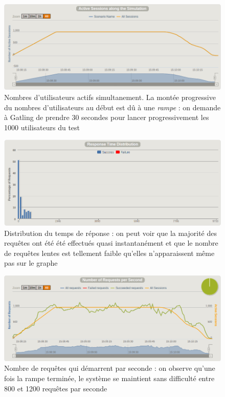 \begin{figure}[h!]
	\centering
		\includegraphics[scale=0.5]{active-sessions.png}
	\caption{Nombres d'utilisateurs actifs simultanement. La montée progressive du nombres d'utilisateurs au début est dû à une \textit{rampe} : on demande à Gatling de prendre 30 secondes pour lancer progressivement les 1000 utilisateurs du test}
\end{figure}

\begin{figure}[h!]
	\centering
		\includegraphics[scale=0.5]{response-time.png}
	\caption{Distribution du temps de réponse : on peut voir que la majorité des requêtes ont été été effectués quasi instantanément et que le nombre de requêtes lentes est tellement faible qu'elles n'apparaissent même pas sur le graphe}
\end{figure}

\begin{figure}[h!]
	\centering
		\includegraphics[scale=0.5]{requests.png}
	\caption{Nombre de requêtes qui démarrent par seconde : on observe qu'une fois la rampe terminée, le système se maintient sans difficulté entre 800 et 1200 requêtes par seconde}
\end{figure}

